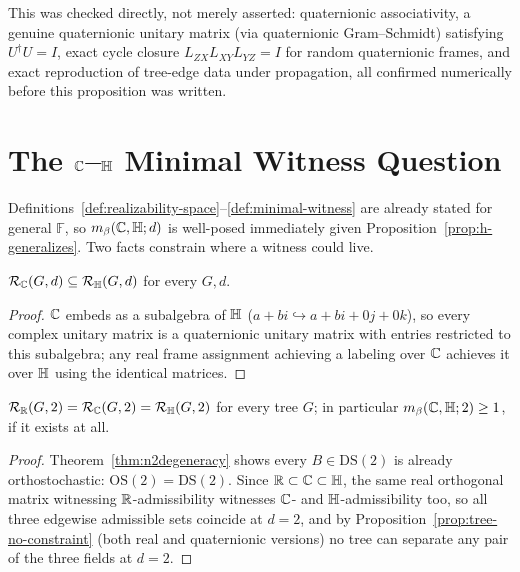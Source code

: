 This was checked directly, not merely asserted: quaternionic associativity,
a genuine quaternionic unitary matrix (via quaternionic Gram--Schmidt)
satisfying $U^\dagger U = I$, exact cycle closure $L_{ZX}L_{XY}L_{YZ}=I$ for
random quaternionic frames, and exact reproduction of tree-edge data under
propagation, all confirmed numerically before this proposition was written.

\section{The \texorpdfstring{$\mathbb{C}$--$\mathbb{H}$}{C-H} Minimal Witness Question}

Definitions~\ref{def:realizability-space}--\ref{def:minimal-witness} are
already stated for general $\mathbb F$, so $m_\beta(\mathbb{C},\mathbb{H};d)$ is
well-posed immediately given
Proposition~\ref{prop:h-generalizes}. Two facts constrain where a witness
could live.

\begin{proposition}
\label{prop:c-subset-h}
$\mathcal R_{\mathbb{C}}(G,d) \subseteq \mathcal R_{\mathbb{H}}(G,d)$ for every $G,d$.
\end{proposition}

\begin{proof}
$\mathbb{C}$ embeds as a subalgebra of $\mathbb{H}$ ($a+bi \hookrightarrow a+bi+0j+0k$),
so every complex unitary matrix is a quaternionic unitary matrix with
entries restricted to this subalgebra; any real frame assignment achieving
a labeling over $\mathbb{C}$ achieves it over $\mathbb{H}$ using the identical matrices.
\end{proof}

\begin{proposition}[No single-edge witness at $d=2$]
\label{prop:no-d2-witness}
$\mathcal R_{\mathbb{R}}(G,2) = \mathcal R_{\mathbb{C}}(G,2) = \mathcal R_{\mathbb{H}}(G,2)$ for every
tree $G$; in particular $m_\beta(\mathbb{C},\mathbb{H};2) \ge 1$, if it exists at all.
\end{proposition}

\begin{proof}
Theorem~\ref{thm:n2degeneracy} shows every $B\in\mathrm{DS}(2)$ is already
orthostochastic: $\mathrm{OS}(2)=\mathrm{DS}(2)$. Since $\mathbb{R}\subset\mathbb{C}\subset
\mathbb{H}$, the same real orthogonal matrix witnessing $\mathbb{R}$-admissibility
witnesses $\mathbb{C}$- and $\mathbb{H}$-admissibility too, so all three edgewise
admissible sets coincide at $d=2$, and by
Proposition~\ref{prop:tree-no-constraint} (both real and quaternionic
versions) no tree can separate any pair of the three fields at $d=2$.
\end{proof}

